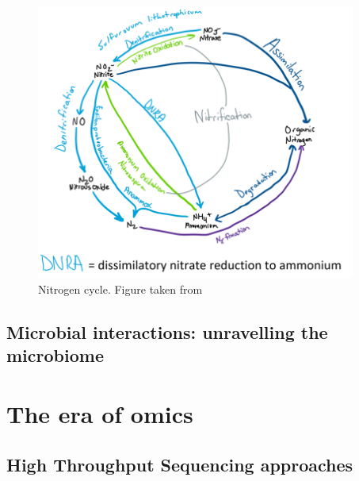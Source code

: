    \begin{figure}[h]
      \centering
      \includegraphics[width=105mm]{figures/802px-Nitrogen_cycle_of_hydrothermal_vents_2.png}
      \caption[Nitrogen cycle]{Nitrogen cycle. Figure taken from \citep{wiki:nitrogen}}
   \end{figure}





\subsection{Microbial interactions: unravelling the microbiome}




\newpage

\section{The era of omics}

\subsection{High Throughput Sequencing approaches}

